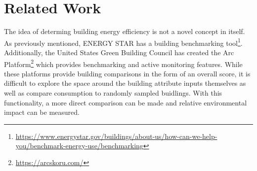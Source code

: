 {\section*{Related Work}}

The idea of determing building energy efficiency is not a novel concept in itself.  As previously mentioned, ENERGY STAR has a building benchmarking tool\footnote{\href{https://www.energystar.gov/buildings/about-us/how-can-we-help-you/benchmark-energy-use/benchmarking }{\url{https://www.energystar.gov/buildings/about-us/how-can-we-help-you/benchmark-energy-use/benchmarking}}}.  Additionally, the United States Green Building Council has created the Arc Platform\footnote{\href{https://arcskoru.com/}{https://arcskoru.com/}} which provides benchmarking and active monitoring features.  While these platforms provide building comparisons in the form of an overall score, it is difficult to explore the space around the building attribute inputs themselves as well as compare consumption to randomly sampled buidlings.  With this functionality, a more direct comparison can be made and relative environmental impact can be measured.


